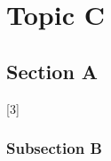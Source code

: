 \chapter{Topic C}\label{ch:maintopicc}
\blindmathtrue

\section{Section A}%
    \Blindtext
    [3]

\subsection{Subsection B}%
    \Blindtext
